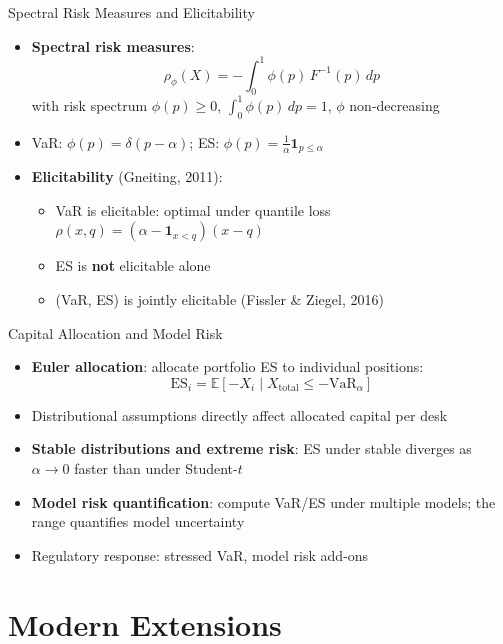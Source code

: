 \documentclass[9pt, aspectratio=169, t]{beamer}
\theoremstyle{definition}
\newcommand{\E}{\mathbb{E}}
\begin{document}
\begin{frame}{Spectral Risk Measures and Elicitability}
\begin{itemize}
\item \textbf{Spectral risk measures}:
\[
\rho_\phi(X) = -\int_0^1 \phi(p)\,F^{-1}(p)\,dp
\]
with risk spectrum $\phi(p) \geq 0$, $\int_0^1 \phi(p)\,dp = 1$, $\phi$ non-decreasing
\item VaR: $\phi(p) = \delta(p - \alpha)$; \quad ES: $\phi(p) = \frac{1}{\alpha}\mathbf{1}_{p \leq \alpha}$
\item \textbf{Elicitability} (Gneiting, 2011):
\begin{itemize}
\item VaR is elicitable: optimal under quantile loss $\rho(x,q) = (\alpha - \mathbf{1}_{x<q})(x-q)$
\item ES is \textbf{not} elicitable alone
\item (VaR, ES) is jointly elicitable (Fissler \& Ziegel, 2016)
\end{itemize}
\end{itemize}
\end{frame}

\begin{frame}{Capital Allocation and Model Risk}
\begin{itemize}
\item \textbf{Euler allocation}: allocate portfolio ES to individual positions:
\[
\text{ES}_i = \E[-X_i \mid X_{\text{total}} \leq -\text{VaR}_\alpha]
\]
\item Distributional assumptions directly affect allocated capital per desk
\item \textbf{Stable distributions and extreme risk}: ES under stable diverges as $\alpha \to 0$ faster than under Student-$t$
\item \textbf{Model risk quantification}: compute VaR/ES under multiple models; the range quantifies model uncertainty
\item Regulatory response: stressed VaR, model risk add-ons
\end{itemize}
\end{frame}

\section{Modern Extensions}
\end{document}
